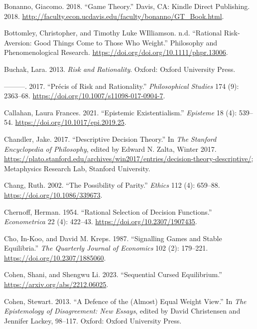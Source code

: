 \documentclass[
  12pt,
  letterpaper,
  DIV=11,
  numbers=noendperiod]{scrreprt}
\newlength{\cslhangindent}
\newenvironment{CSLReferences}[2] %
 {\begin{list}{}{%
  \setlength{\itemindent}{0pt}
  \setlength{\leftmargin}{0pt}
  \setlength{\parsep}{0pt}
  \ifodd #1
   \setlength{\leftmargin}{\cslhangindent}
   \setlength{\itemindent}{-1\cslhangindent}
  \fi
  \setlength{\itemsep}{#2\baselineskip}}}
 {\end{list}}
\begin{document}
\begin{CSLReferences}{1}{0}
Bonanno, Giacomo. 2018. {``Game Theory.''} Davis, CA: Kindle Direct
Publishing. 2018.
\url{http://faculty.econ.ucdavis.edu/faculty/bonanno/GT_Book.html}.

Bottomley, Christopher, and Timothy Luke WIlliamson. n.d. {``Rational
Risk-Aversion: Good Things Come to Those Who Weight.''} {P}hilosophy and
{P}henomenological {R}esearch.
\url{https://doi.org/doi.org/10.1111/phpr.13006}.

Buchak, Lara. 2013. \emph{Risk and Rationality}. Oxford: Oxford
University Press.

---------. 2017. {``Pr{é}cis of Risk and Rationality.''}
\emph{Philosophical Studies} 174 (9): 2363--68.
\url{https://doi.org/10.1007/s11098-017-0904-7}.

Callahan, Laura Frances. 2021. {``Epistemic Existentialism.''}
\emph{Episteme} 18 (4): 539--54.
\url{https://doi.org/10.1017/epi.2019.25}.

Chandler, Jake. 2017. {``{Descriptive Decision Theory}.''} In \emph{The
{Stanford} Encyclopedia of Philosophy}, edited by Edward N. Zalta,
{W}inter 2017.
\url{https://plato.stanford.edu/archives/win2017/entries/decision-theory-descriptive/};
Metaphysics Research Lab, Stanford University.

Chang, Ruth. 2002. {``The Possibility of Parity.''} \emph{Ethics} 112
(4): 659--88. \url{https://doi.org/10.1086/339673}.

Chernoff, Herman. 1954. {``Rational Selection of Decision Functions.''}
\emph{Econometrica} 22 (4): 422--43.
\url{https://doi.org/10.2307/1907435}.

Cho, In-Koo, and David M. Kreps. 1987. {``Signalling Games and Stable
Equilibria.''} \emph{The Quarterly Journal of Economics} 102 (2):
179--221. \url{https://doi.org/10.2307/1885060}.

Cohen, Shani, and Shengwu Li. 2023. {``Sequential Cursed Equilibrium.''}
\url{https://arxiv.org/abs/2212.06025}.

Cohen, Stewart. 2013. {``A Defence of the (Almost) Equal Weight View.''}
In \emph{The Epistemology of Disagreement: New Essays}, edited by David
Christensen and Jennifer Lackey, 98--117. Oxford: Oxford University
Press.


\end{CSLReferences}
\end{document}

